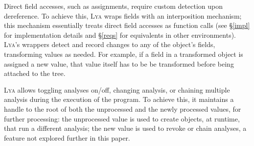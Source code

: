 \documentclass[letterpaper,twocolumn,10pt]{article}
\newcommand{\ttt}[1]{\texttt{#1}}
\newcommand{\sys}{{\scshape Lya}\xspace}
\newcommand{\pc}{PIC\xspace}
\newcommand{\fixme}[1]{{\color{red}#1}}
\begin{document}
% 
% 
% 

Direct field accesses, such as assignments, require custom detection upon dereference.
To achieve this, \sys wraps fields with an interposition mechanism;
  this mechanism essentially treats direct field accesses as function calls (see \S\ref{impl} for implementation details and \S\ref{reqs} for equivalents in other environments).
\sys's wrappers detect and record changes to any of the object's fields, transforming values as needed.
For example, if a field in a transformed object is assigned a new value, that value itself has to be be transformed before being attached to the \fixme{tree}.

\sys allows toggling analyses on/off, changing analysis, or chaining multiple analysis during the execution of the program.
To achieve this, it maintains a handle to the root of both the unprocessed and the newly processed values, for further processing:
  the unprocessed value is used to create objects, at runtime, that run a different analysis;
  the new value is used to revoke or chain analyses, a feature not explored further in this paper.
\end{document}
